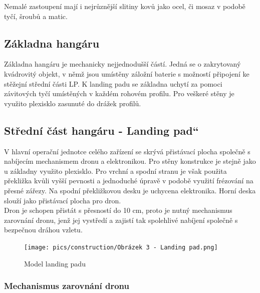 \documentclass[a4paper]{article}
\newcommand\uvoz[1]{\quotedblbase #1\textquotedblleft}%
\begin{document}
    \noindent    
    Nemalé zastoupení mají i nejrůznější slitiny kovů jako ocel, či mosaz v podobě tyčí, šroubů a matic.\\

    \subsection{Základna hangáru}\label{32-zuxe1kladna-hanguxe1ru}
    
    Základna hangáru je mechanicky nejjednodušší částí. Jedná se o zakrytovaný kvádrovitý objekt, v němž jsou umístěny záložní baterie s možností připojení ke stěžejní střední části \acs{LP}. K landing padu se základna uchytí za pomoci závitových tyčí umístěných v každém rohovém profilu. Pro veškeré stěny je využito plexisklo zasunuté do drážek profilů.\\
    
    \subsection{Střední část hangáru - \uvoz{Landing pad}}\label{33-stux159ednuxed-ux10duxe1st-hanguxe1ru---landing-pad}
    
    V hlavní operační jednotce celého zařízení se skrývá přistávací plocha společně s nabíjecím mechanismem dronu a elektronikou. Pro stěny konstrukce je stejně jako u základny využito plexisklo. Pro vrchní a spodní stranu je však použita překližka kvůli vyšší pevnosti a jednoduché úpravě v podobě využití frézování na přesné zářezy. Na spodní překližkovou desku je uchycena elektronika. Horní deska slouží jako přistávací plocha pro dron.\\

    \noindent    
    Dron je schopen přistát s přesností do 10 cm, proto je nutný mechanismus zarovnání dronu, jenž jej vystředí a zajistí tak spolehlivé nabíjení společně s bezpečnou dráhou vzletu.\\

    \begin{figure}
        \centering
        \texttt{[image: pics/construction/Obrázek 3 - Landing pad.png]}
        \caption{Model landing padu}
        \label{fig:const_3}
    \end{figure}
    
    \subsubsection{Mechanismus zarovnání dronu}\label{331-mechanismus-zarovnuxe1nuxed-dronu}
    
\end{document}
